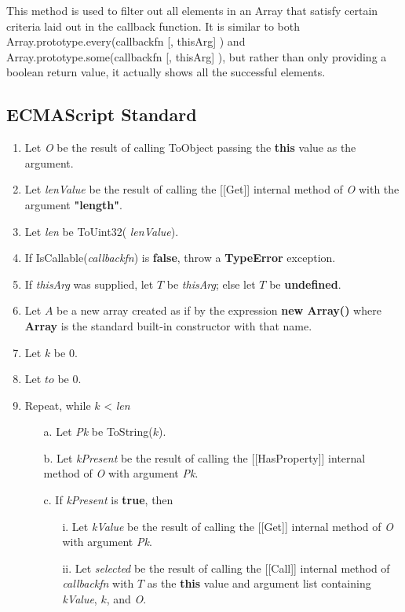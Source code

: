 \documentclass[a4paper,11pt,twoside]{report}
\begin{document}
This method is used to filter out all elements in an Array that satisfy certain criteria laid out in the callback function. It is similar to both Array.prototype.every(callbackfn [, thisArg] ) and Array.prototype.some(callbackfn [, thisArg] ), but rather than only providing a boolean return value, it actually shows all the successful elements.

\subsection{ECMAScript Standard}
\begin{enumerate}
\item Let \textit{O} be the result of calling ToObject passing the \textbf{this} value as the argument.
\item Let \textit{lenValue} be the result of calling the [[Get]] internal method of \textit{O} with the argument \textbf{"length"}.
\item Let \textit{len} be ToUint32( \textit{lenValue}).
\item If IsCallable(\textit{callbackfn}) is \textbf{false}, throw a \textbf{TypeError} exception.
\item If \textit{thisArg} was supplied, let $T$ be \textit{thisArg}; else let $T$ be \textbf{undefined}.
\item Let $A$ be a new array created as if by the expression \textbf{new Array()} where \textbf{Array} is the standard built-in constructor with that name.
\item Let $k$ be 0.
\item Let $to$ be 0.
\item Repeat, while $k$ < \textit{len}
\begin{enumerate}
\item[a.] Let \textit{Pk} be ToString($k$).
\item[b.] Let \textit{kPresent} be the result of calling the [[HasProperty]] internal method of \textit{O} with argument \textit{Pk}.
\item[c.] If \textit{kPresent} is \textbf{true}, then
\begin{enumerate}
\item[i.] Let \textit{kValue} be the result of calling the [[Get]] internal method of \textit{O} with argument \textit{Pk}.
\item[ii.] Let \textit{selected} be the result of calling the [[Call]] internal method of \textit{callbackfn} with $T$ as the \textbf{this} value and argument list containing \textit{kValue}, $k$, and \textit{O}.

\end{enumerate}
\end{enumerate}
\end{enumerate}
\end{document}
